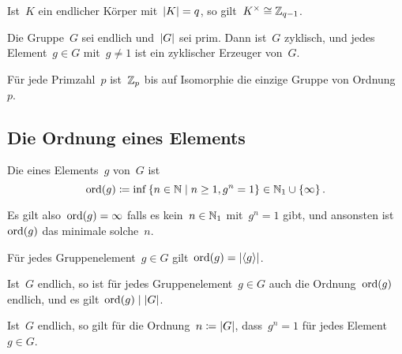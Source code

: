 \begin{corollary}
  Ist~$K$ ein endlicher Körper mit~$\lvert K\rvert = q$, so gilt~$K^\times \cong \mathbb{Z}_{q-1}$.
\end{corollary}

\begin{proposition}
  Die Gruppe~$G$ sei endlich und~$\lvert G\rvert$ sei prim.
  Dann ist~$G$ zyklisch, und jedes Element~$g \in G$ mit~$g \neq 1$ ist ein zyklischer Erzeuger von~$G$.
\end{proposition}

\begin{corollary}
  Für jede Primzahl~$p$ ist~$\mathbb{Z}_p$ bis auf Isomorphie die einzige Gruppe von Ordnung~$p$.
\end{corollary}



\subsection{Die Ordnung eines Elements}

\begin{definition}
  Die  eines Elements~$g$ von~$G$ ist
  \[
    \ord(g)
    \defined
    \inf
    {}
    \{
      n \in \Natural
    \suchthat
      n \geq 1,
      g^n = 1
    \}
    \in
    \Natural_1 \cup \{ \infty \} \,.
  \]
\end{definition}

\begin{remark}
  Es gilt also~$\operatorname{ord}(g) = \infty$ falls es kein~$n \in \mathbb{N}_1$ mit~$g^n = 1$ gibt, und ansonsten ist~$\operatorname{ord}(g)$ das minimale solche~$n$.
\end{remark}

\begin{proposition}
  Für jedes Gruppenelement~$g \in G$ gilt~$\operatorname{ord}(g) = \lvert\langle g\rangle\rvert$.
\end{proposition}

\begin{corollary}
  Ist~$G$ endlich, so ist für jedes Gruppenelement~$g \in G$ auch die Ordnung~$\operatorname{ord}(g)$ endlich, und es gilt~$\operatorname{ord}(g) \mid \lvert G\rvert$.
\end{corollary}

\begin{corollary}
  Ist~$G$ endlich, so gilt für die Ordnung~$n \coloneqq \lvert G\rvert$, dass~$g^n = 1$ für jedes Element~$g \in G$.
\end{corollary}





